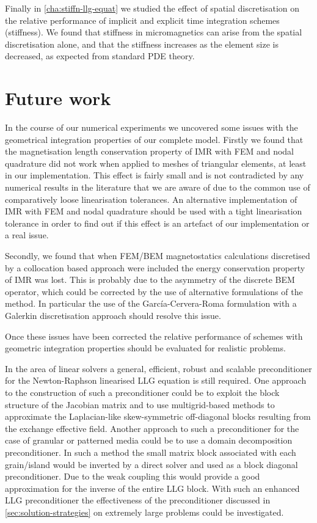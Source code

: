 Finally in \cref{cha:stiffn-llg-equat} we studied the effect of spatial discretisation on the relative performance of implicit and explicit time integration schemes (stiffness).
We found that stiffness in micromagnetics can arise from the spatial discretisation alone, and that the stiffness increases as the element size is decreased, as expected from standard PDE theory.



\section{Future work}


In the course of our numerical experiments we uncovered some issues with the geometrical integration properties of our complete model.
Firstly we found that the magnetisation length conservation property of IMR with FEM and nodal quadrature did not work when applied to meshes of triangular elements, at least in our implementation.
This effect is fairly small and is not contradicted by any numerical results in the literature that we are aware of due to the common use of comparatively loose linearisation tolerances.
An alternative implementation of IMR with FEM and nodal quadrature should be used with a tight linearisation tolerance in order to find out if this effect is an artefact of our implementation or a real issue.

Secondly, we found that when FEM/BEM magnetostatics calculations discretised by a collocation based approach were included the energy conservation property of IMR was lost.
This is probably due to the asymmetry of the discrete BEM operator, which could be corrected by the use of alternative formulations of the method.
In particular the use of the Garc\'{i}a-Cervera-Roma formulation \cite{Garcia-Cervera2006} with a Galerkin discretisation approach \cite[75]{Wrobel2002} should resolve this issue.

Once these issues have been corrected the relative performance of schemes with geometric integration properties should be evaluated for realistic problems.

In the area of linear solvers a general, efficient, robust and scalable preconditioner for the Newton-Raphson linearised LLG equation is still required.
One approach to the construction of such a preconditioner could be to exploit the block structure of the Jacobian matrix and to use multigrid-based methods to approximate the Laplacian-like skew-symmetric off-diagonal blocks resulting from the exchange effective field.
Another approach to such a preconditioner for the case of granular or patterned media could be to use a domain decomposition preconditioner.
In such a method the small matrix block associated with each grain/island would be inverted by a direct solver and used as a block diagonal preconditioner.
Due to the weak coupling this would provide a good approximation for the inverse of the entire LLG block.
With such an enhanced LLG preconditioner the effectiveness of the preconditioner discussed in \cref{sec:solution-strategies} on extremely large problems could be investigated.



